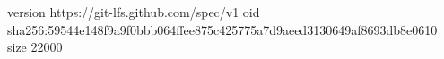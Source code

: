 version https://git-lfs.github.com/spec/v1
oid sha256:59544e148f9a9f0bbb064ffee875c425775a7d9aeed3130649af8693db8e0610
size 22000
